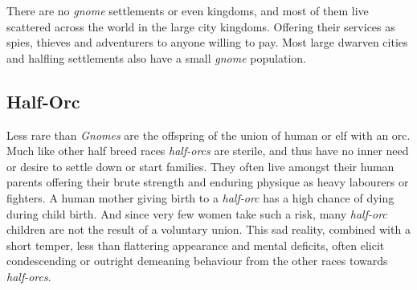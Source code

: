There are no \emph{gnome} settlements or even kingdoms, and most of them live
scattered across the world in the large city kingdoms. Offering their services
as spies, thieves and adventurers to anyone willing to pay. Most large dwarven
cities and halfling settlements also have a small \emph{gnome} population.

\subsection*{Half-Orc}

Less rare than \emph{Gnomes} are the offspring of the union of human or elf
with an orc. Much like other half breed races \emph{half-orcs} are sterile,
and thus have no inner need or desire to settle down or start families. They
often live amongst their human parents offering their brute strength and
enduring physique as heavy labourers or fighters. A human mother giving birth
to a \emph{half-orc} has a high chance of dying during child birth. And since
very few women take such a risk, many \emph{half-orc} children are not the
result of a voluntary union. This sad reality, combined with a short temper,
less than flattering appearance and mental deficits, often elicit condescending
or outright demeaning behaviour from the other races towards \emph{half-orcs}.
